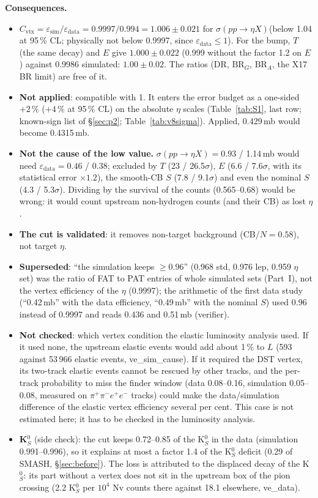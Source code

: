 \documentclass[11pt,a4paper]{article}
\newcommand{\ppee}{\ensuremath{\pi^{+}\pi^{-}e^{+}e^{-}}\xspace}
\newcommand{\BRG}{\ensuremath{\mathrm{BR}_G}\xspace}
\newcommand{\BRA}{\ensuremath{\mathrm{BR}_A}\xspace}
\newcommand{\sigeta}{\ensuremath{\sigma(pp\to\eta X)}\xspace}
\begin{document}
\textbf{Consequences.}
\begin{itemize}\setlength{\itemsep}{0pt}
\item $C_{\mathrm{vtx}}=\varepsilon_{\mathrm{sim}}/\varepsilon_{\mathrm{data}}=0.9997/0.994=1.006\pm0.021$ for \sigeta (below 1.04 at 95\,\% CL;
      physically not below 0.9997, since $\varepsilon_{\mathrm{data}}\le1$). For the bump, $T$ (the same decay) and $E$ give $1.000\pm0.022$
      (0.999 without the factor 1.2 on $E$) against 0.9986 simulated: $1.00\pm0.02$. The ratios (DR, \BRG, \BRA, the X17 BR limit) are free of it.
\item \textbf{Not applied}: compatible with 1. It enters the error budget as a one-sided $+2$\,\% ($+4$\,\% at 95\,\% CL) on the absolute $\eta$
      scales (Table~\ref{tab:S1}, last row; known-sign list of \S\ref{sec:p2}; Table~\ref{tab:v8sigma}). Applied, 0.429\,mb would become 0.4315\,mb.
\item \textbf{Not the cause of the low value.} \sigeta $=0.93$ / 1.14\,mb would need $\varepsilon_{\mathrm{data}}=0.46$ / 0.38; excluded by $T$
      (23 / 26.5$\sigma$), $E$ (6.6 / 7.6$\sigma$, with its statistical error $\times1.2$), the smooth-CB $S$ (7.8 / 9.1$\sigma$) and even the
      nominal $S$ (4.3 / 5.3$\sigma$). Dividing by
      the survival of the counts (0.565--0.68) would be wrong: it would count upstream non-hydrogen counts (and their CB) as lost $\eta$.
\item \textbf{The cut is validated}: it removes non-target background (CB$/N=0.58$), not target $\eta$.
\item \textbf{Superseded}: ``the simulation keeps $\ge0.96$'' (0.968 std, 0.976 lep, 0.959 $\eta$ set) was the ratio of FAT to PAT entries of whole
      simulated sets (Part~I), not the vertex efficiency of the $\eta$ (0.9997); the arithmetic of the first data study (``0.42\,mb'' with the data
      efficiency, ``0.49\,mb'' with the nominal $S$) used 0.96 instead of 0.9997 and reads 0.436 and 0.51\,mb (verifier).
\item \textbf{Not checked}: which vertex condition the elastic luminosity analysis used. If it used none, the upstream elastic events would add
      about 1\,\% to $L$ (593 against 53\,966 elastic events, ve\_sim\_cause). If it required the DST vertex, its two-track elastic events cannot be
      rescued by other tracks, and the per-track probability to miss the finder window (data 0.08--0.16, simulation 0.05--0.08, measured on \ppee
      tracks) could make the data/simulation difference of the elastic vertex efficiency several per cent. This case is not estimated here; it has
      to be checked in the luminosity analysis.
\item \textbf{K$^0_S$} (side check): the cut keeps 0.72--0.85 of the K$^0_S$ in the data (simulation 0.991--0.996), so it explains at most a
      factor 1.4 of the K$^0_S$ deficit (0.29 of SMASH, \S\ref{sec:before}). The loss is attributed to the displaced decay of the K$^0_S$: its part
      without a vertex does not sit in the upstream box of the pion crossing (2.2 K$^0_S$ per $10^4$ Nv counts there against 18.1 elsewhere, ve\_data).
\end{itemize}
\end{document}
